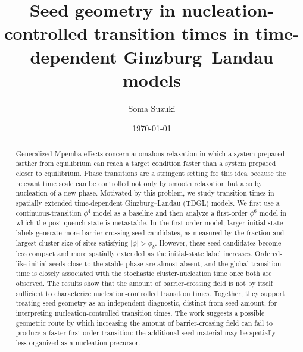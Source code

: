 ﻿\documentclass[aps,pre,preprint,showkeys,amsmath,amssymb,superscriptaddress,longbibliography]{revtex4-2}
\begin{document}
\title{Seed geometry in nucleation-controlled transition times in time-dependent Ginzburg--Landau models}

\author{Soma Suzuki}
\date{\today}


\begin{abstract}
Generalized Mpemba effects concern anomalous relaxation in which a system prepared farther from equilibrium can reach a target condition faster than a system prepared closer to equilibrium. Phase transitions are a stringent setting for this idea because the relevant time scale can be controlled not only by smooth relaxation but also by nucleation of a new phase. Motivated by this problem, we study transition times in spatially extended time-dependent Ginzburg--Landau (TDGL) models. We first use a continuous-transition $\phi^4$ model as a baseline and then analyze a first-order $\phi^6$ model in which the post-quench state is metastable. In the first-order model, larger initial-state labels generate more barrier-crossing seed candidates, as measured by the fraction and largest cluster size of sites satisfying $|\phi|>\phi_b$. However, these seed candidates become less compact and more spatially extended as the initial-state label increases. Ordered-like initial seeds close to the stable phase are almost absent, and the global transition time is closely associated with the stochastic cluster-nucleation time once both are observed. The results show that the amount of barrier-crossing field is not by itself sufficient to characterize nucleation-controlled transition times. Together, they support treating seed geometry as an independent diagnostic, distinct from seed amount, for interpreting nucleation-controlled transition times. The work suggests a possible geometric route by which increasing the amount of barrier-crossing field can fail to produce a faster first-order transition: the additional seed material may be spatially less organized as a nucleation precursor.
\end{abstract}


\maketitle


\end{document}
